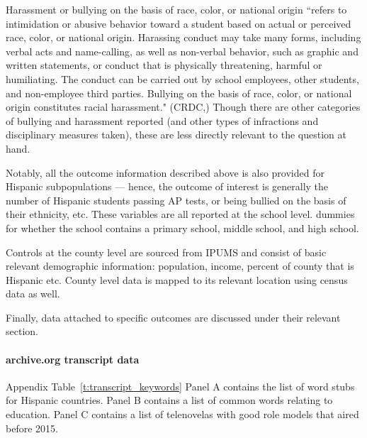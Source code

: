 \documentclass[11pt]{article}
\begin{document}
\begin{itemize}
Harassment or bullying on the basis of race, color, or national origin ``refers to intimidation or abusive behavior toward a student based on actual or perceived race, color, or national origin. Harassing conduct may take many forms, including verbal acts and name-calling, as well as non-verbal behavior, such as graphic and written statements, or conduct that is physically threatening, harmful or humiliating. The conduct can be carried out by school employees, other students, and non-employee third parties. Bullying on the basis of race, color, or national origin constitutes racial harassment." (CRDC,\cite{noauthor_master_2016}) Though there are other categories of bullying and harassment reported (and other types of infractions and disciplinary measures taken), these are less directly relevant to the question at hand.


\end{itemize}

Notably, all the outcome information described above is also provided for Hispanic subpopulations --- hence, the outcome of interest is generally the number of Hispanic students passing AP tests, or being bullied on the basis of their ethnicity, etc. These variables are all reported at the school level. 
dummies for whether the school contains a primary school, middle school, and high school. 



Controls at the county level are sourced from IPUMS and consist of basic relevant demographic information: population, income, percent of county that is Hispanic etc. County level data is mapped to its relevant location using census data as well. 


Finally, data attached to specific outcomes are discussed under their relevant section.


\paragraph{archive.org transcript data} 
Appendix Table~\ref{t:transcript_keywords} Panel A contains the list of word stubs for Hispanic countries. Panel B contains a list of common words relating to education. Panel C contains a list of telenovelas with good role models that aired before 2015.
\end{document}
